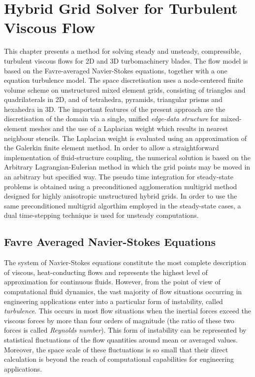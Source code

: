 %
%
%
\chapter{Hybrid Grid Solver for Turbulent Viscous Flow}
\label{flow_model.chap}
\setcounter{footnote}{0}
%
%
%
 This chapter presents a method for solving steady and unsteady, compressible,
 turbulent viscous flows for 2D and 3D turbomachinery blades.
 The flow model is based on the Favre-averaged Navier-Stokes equations,
 together with a one equation turbulence model.
 The space discretisation uses a node-centered finite volume scheme
 on unstructured mixed element grids, consisting
 of triangles and quadrilaterals in 2D, and of tetrahedra, pyramids, 
 triangular prisms and hexahedra in 3D. 
 The important features of the present approach are the 
 discretisation of the domain via a single, unified {\em edge-data structure}
 for mixed-element meshes and the use of a Laplacian weight
 which results in nearest neighbour stencils.
 The Laplacian weight is evaluated using an approximation of the
 Galerkin finite element method.
 In order to allow a straightforward implementation of fluid-structure
 coupling, the numerical solution is based on the Arbitrary
 Lagrangian-Eulerian method in which the grid points may be moved
 in an arbitrary but specified way.
 The pseudo time integration for steady-state problems is obtained using a
 preconditioned agglomeration multigrid method designed for highly
 anisotropic unstructured hybrid grids.
 In order to use the same preconditioned multigrid
 algorthim employed in the steady-state cases,
 a dual time-stepping technique is used for unsteady computations.
%
%

%
%
\section{Favre Averaged Navier-Stokes Equations}
\label{mathematical_model.sec}
%
 The system of Navier-Stokes equations constitute the most complete
 description of viscous, heat-conducting flows and represents the highest
 level of approximation for continuous fluids.
 However, from the point of view of computational fluid dynamics,
 the vast majority of flow situations occurring in engineering
 applications enter into a particular form of instability, called
 {\em turbulence}.
 This occurs in most flow situations when the inertial forces
 exceed the viscous forces by more than four orders of magnitude
 (the ratio of these two forces is called {\em Reynolds number}).
 This form of instability can be represented by statistical
 fluctuations of the flow quantities around mean or averaged values.
 Moreover, the space scale of these fluctuations is so small that their
 direct calculation is beyond the reach of computational capabilities
 for engineering applications.


